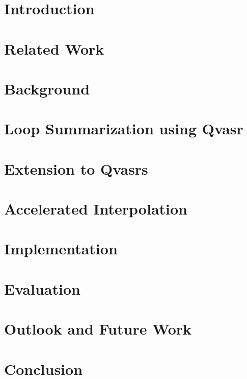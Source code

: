 \documentclass[11pt]{article}
\begin{document}
\newcommand{\HorizontalLine}{\rule{\linewidth}{0.3mm}}



\pagebreak


\pagebreak



\tableofcontents
\pagebreak

\section{Introduction}
\label{intro}


\section{Related Work}
\label{relWork}


\section{Background}
\label{background}


\section{Loop Summarization using Qvasr}
\label{qvasr}


\section{Extension to Qvasrs}
\label{qvasrs}


\section{Accelerated Interpolation}
\label{accelInterpol}


\section{Implementation}
\label{impl}


\section{Evaluation}
\label{eval}


\section{Outlook and Future Work}
\label{futrWork}


\section{Conclusion}
\label{concl}



\pagebreak


\end{document}
